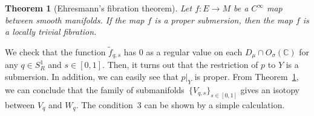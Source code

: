 \documentclass[pdftex]{sigma}
\numberwithin{equation}{section}
\newtheorem{Theorem}{Theorem}[section]
\begin{document}
\begin{Theorem}[Ehresmann's f\/ibration theorem]\label{th:ehr}
Let $f \colon E \to M$ be a $C^\infty$ map between smooth manifolds. If the map $f$ is a proper submersion, then the map $f$ is a locally trivial fibration.
\end{Theorem}

We check that the function $\tilde{f}_{q,s}$ has $0$ as a regular value on each $D_\mu \cap O_\sigma({\mathbb C})$ for any $q \in S_R^1$ and $s \in [0, 1]$.
Then, it turns out that the restriction of $p$ to $Y$ is a submersion. In addition, we can easily see that $p|_Y$ is proper.
From Theorem~\ref{th:ehr}, we can conclude that the family of submanifolds~$\{V_{q,s}\}_{s \in [0,1]}$ gives an isotopy between $V_q$ and $W_q$.
The condition~3 can be shown by a simple calculation.
\end{document}

